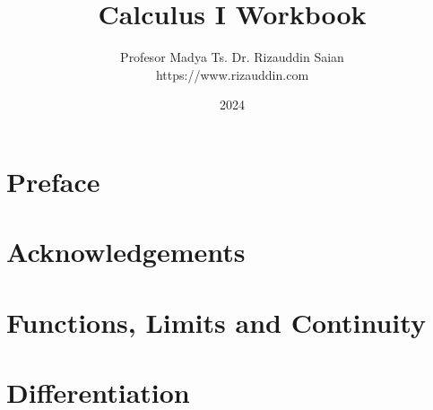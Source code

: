 \documentclass[12pt,a4paper,oneside]{report}
\title{Calculus I Workbook}
\author{Profesor Madya Ts. Dr. Rizauddin Saian\\
https://www.rizauddin.com
}
\date{2024}
\begin{document}

%

\frontmatter

\maketitle

\ifincludesow
    
    
\fi

\chapter*{Preface}


\chapter*{Acknowledgements}


\tableofcontents

\mainmatter
\chapter{Functions, Limits and Continuity}
\makenewpage
\makenewpage
\makenewpage
\makenewpage
\makenewpage
\makenewpage
\makenewpage

\chapter{Differentiation}
\makenewpage
\makenewpage
\makenewpage
\makenewpage
\makenewpage
\makenewpage
\end{document}
